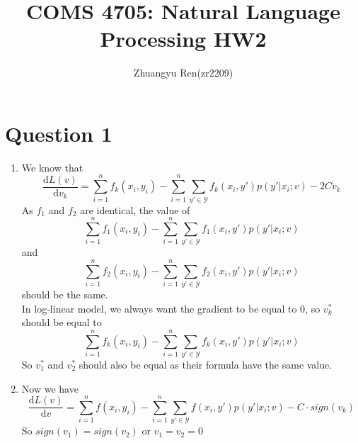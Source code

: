 \documentclass[12pt]{article}
\begin{document}
 
 
 
\title{COMS 4705: Natural Language Processing HW2}%
%
\author{Zhuangyu Ren(zr2209)\\ %
} %
 
\maketitle
 \indent 
\section*{Question 1}
\begin{enumerate}
	\item 
	We know that
	$$\frac{\mathrm{d} L(v)}{\mathrm{d} v_k}=\sum _{i=1}^nf_k(x_i,y_i)-\sum_{i=1}^{n}\sum_{y'\in \mathcal Y}f_k(x_i,y')p(y'|x_i;v)-2Cv_k$$
	As $f_1$ and $f_2$ are identical, the value of 
	$$\sum _{i=1}^nf_1(x_i,y_i)-\sum_{i=1}^{n}\sum_{y'\in \mathcal Y}f_1(x_i,y')p(y'|x_i;v)$$
	and 
	$$\sum _{i=1}^nf_2(x_i,y_i)-\sum_{i=1}^{n}\sum_{y'\in \mathcal Y}f_2(x_i,y')p(y'|x_i;v)$$
	should be the same.\\
	In log-linear model, we always want the gradient to be equal to 0, so $v_k^*$ should be equal to 
	$$\sum _{i=1}^nf_k(x_i,y_i)-\sum_{i=1}^{n}\sum_{y'\in \mathcal Y}f_k(x_i,y')p(y'|x_i;v)$$
	So $v_1^*$ and $v_2^*$ should also be equal as their formula have the same value.\\
	
	\item
	Now we have
	$$\frac{\mathrm{d} L(v)}{\mathrm{d} v}=\sum _{i=1}^nf(x_i,y_i)-\sum_{i=1}^{n}\sum_{y'\in \mathcal Y}f(x_i,y')p(y'|x_i;v)-C\cdot sign(v_k)$$
	So $sign(v_1)=sign(v_2)$ or $v_1=v_2=0$\\
	
\end{enumerate}
\end{document}
